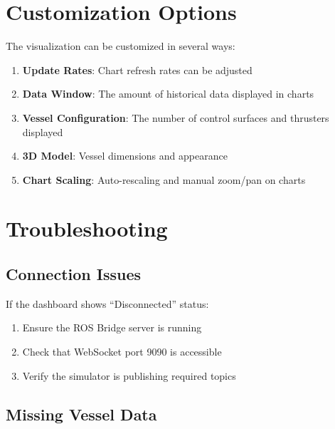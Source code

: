 \documentclass[
  letterpaper,
  DIV=11,
  numbers=noendperiod]{scrreprt}
\providecommand{\tightlist}{%
  \setlength{\itemsep}{0pt}\setlength{\parskip}{0pt}}\usepackage{longtable,booktabs,array}
\begin{document}
\section*{Customization Options}\label{customization-options}


The visualization can be customized in several ways:

\begin{enumerate}
\def\labelenumi{\arabic{enumi}.}
\tightlist
\item
  \textbf{Update Rates}: Chart refresh rates can be adjusted
\item
  \textbf{Data Window}: The amount of historical data displayed in
  charts
\item
  \textbf{Vessel Configuration}: The number of control surfaces and
  thrusters displayed
\item
  \textbf{3D Model}: Vessel dimensions and appearance
\item
  \textbf{Chart Scaling}: Auto-rescaling and manual zoom/pan on charts
\end{enumerate}

\section*{Troubleshooting}\label{troubleshooting-1}


\subsection*{Connection Issues}\label{connection-issues}

If the dashboard shows ``Disconnected'' status:

\begin{enumerate}
\def\labelenumi{\arabic{enumi}.}
\tightlist
\item
  Ensure the ROS Bridge server is running
\item
  Check that WebSocket port 9090 is accessible
\item
  Verify the simulator is publishing required topics
\end{enumerate}

\subsection*{Missing Vessel Data}\label{missing-vessel-data}
\end{document}
